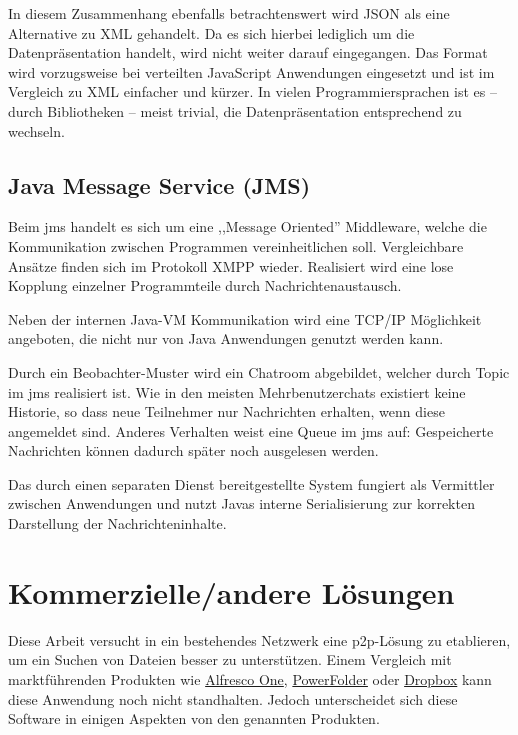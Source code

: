 \documentclass[oneside, ngerman, toc=bibliography,bibliography=totoc,listof=entryprefix, open=right,numbers=noenddot,fontsize=12pt]{scrbook}
\begin{document}
In diesem Zusammenhang ebenfalls betrachtenswert wird {JSON} als eine Alternative zu {XML} gehandelt. Da es sich hierbei lediglich um die Datenpräsentation handelt, wird nicht weiter darauf eingegangen. Das Format wird vorzugsweise bei verteilten JavaScript Anwendungen eingesetzt und ist im Vergleich zu {XML} einfacher und kürzer. In vielen Programmiersprachen ist es -- durch Bibliotheken -- meist trivial, die Datenpräsentation entsprechend zu wechseln.


\subsection{Java Message Service (JMS)}
\label{chap:jms}
Beim \acrfull{jms} handelt es sich um eine ,,Message Oriented'' Middleware, welche die Kommunikation zwischen Programmen vereinheitlichen soll. Vergleichbare Ansätze finden sich im Protokoll XMPP wieder. Realisiert wird eine lose Kopplung einzelner Programmteile durch Nachrichtenaustausch.

Neben der internen Java-VM Kommunikation wird eine {TCP/IP} Möglichkeit angeboten, die nicht nur von Java Anwendungen genutzt werden kann.

Durch ein Beobachter-Muster  wird ein Chatroom abgebildet, welcher durch Topic im  \acrshort{jms} realisiert ist.
Wie in den meisten Mehrbenutzerchats existiert keine Historie, so dass neue Teilnehmer nur Nachrichten erhalten, wenn diese angemeldet sind.
Anderes Verhalten weist eine Queue im \acrshort{jms} auf: Gespeicherte Nachrichten können dadurch später noch ausgelesen werden.

Das durch einen separaten Dienst bereitgestellte System fungiert als Vermittler zwischen Anwendungen und nutzt Javas interne Serialisierung zur korrekten Darstellung der Nachrichteninhalte.
 


\section{Kommerzielle/andere Lösungen}
Diese Arbeit versucht in ein bestehendes Netzwerk eine \acrshort{p2p}-Lösung zu etablieren, um ein Suchen von Dateien besser zu unterstützen. Einem Vergleich mit marktführenden Produkten wie  \href{http://www.alfresco.com/}{{Alfresco One}}, \href{https://www.powerfolder.com/de/powerfolder-erhalt-qualitatssiegel-it-security-made-in-germany/}{{PowerFolder}} oder \href{https://www.dropbox.com/de/}{{Dropbox}} kann diese Anwendung noch nicht standhalten.
Jedoch unterscheidet sich diese Software in einigen Aspekten von den genannten Produkten.
\end{document}
